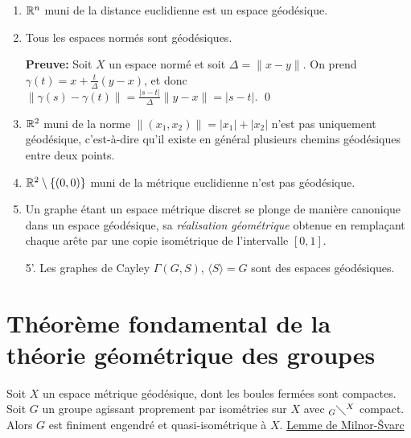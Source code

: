   \begin{exs}
    \begin{enumerate}
    \item $\mathbb{R}^n$ muni de la distance euclidienne est un espace géodésique.
    \item Tous les espaces normés sont géodésiques.

      \textbf{Preuve:} Soit $X$ un espace normé et soit $\Delta = \|x - y\|$. On prend $\gamma(t) = x +
      \frac{t}{\Delta}(y-x)$, et donc $\|\gamma(s) - \gamma(t)\| = \frac{|s-t|}{\Delta}\|y-x\| = |s-t|$. \qed

    \item $\mathbb{R}^2$ muni de la norme $\|(x_1, x_2)\| = |x_1| + |x_2|$ n'est pas uniquement géodésique,
      c'est-à-dire qu'il existe en général plusieurs chemins géodésiques entre deux points.

    \item $\mathbb{R}^2 \setminus \{(0,0)\}$ muni de la métrique euclidienne n'est pas géodésique.

      
    \item Un graphe étant un espace métrique discret se plonge de manière canonique dans un espace géodésique,
      sa \emph{réalisation géométrique}  obtenue en remplaçant chaque arête par
      une copie isométrique de l'intervalle $[0,1]$.

      
    \item[5'.] Les graphes de Cayley $\Gamma(G, S)$, $\langle S \rangle = G$ sont des espaces géodésiques.
    \end{enumerate}
  \end{exs}
  
 

  \section{Théorème fondamental de la théorie géométrique des groupes}
  \label{sec:thm-fond-theorie-geom-groupes}


  \begin{theo} \label{thm:milnor-svarc} 
    Soit $X$ un espace métrique géodésique, dont les boules fermées sont compactes. Soit $G$ un groupe
    agissant proprement par isométries sur $X$ avec $_G\diagdown^X$ compact. Alors $G$ est finiment engendré
    et quasi-isométrique à $X$. \href{https://392c.wordpress.com/2009/02/09/thesvarc-milnor-lemma/}{Lemme de Milnor-\v{S}varc}
  \end{theo}


